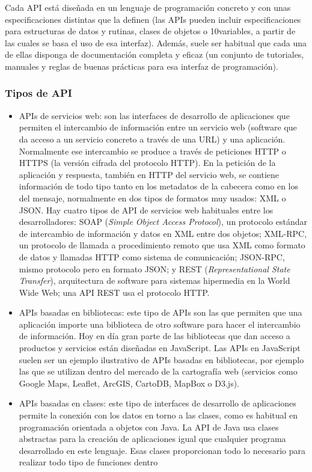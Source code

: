 Cada API está diseñada en un lenguaje de programación concreto y con unas especificaciones distintas que la definen (las APIs pueden incluir especificaciones para estructuras de datos y rutinas, clases de objetos o
10variables, a partir de las cuales se basa el uso de esa interfaz). Además, suele ser habitual que cada una de ellas disponga de documentación completa y eficaz (un conjunto de tutoriales, manuales y reglas de buenas prácticas para esa interfaz de programación).

\subsubsection*{Tipos de API}

\begin{itemize}
  \item APIs de servicios web: son las interfaces de desarrollo de aplicaciones que permiten el intercambio de información entre un servicio web (software que da acceso a un servicio concreto a través de una URL) y una aplicación. Normalmente ese intercambio se produce a través de peticiones HTTP o HTTPS (la versión cifrada del protocolo HTTP). En la petición de la aplicación y respuesta, también en HTTP del servicio web, se contiene información de todo tipo tanto en los metadatos de la cabecera como en los del mensaje, normalmente en dos tipos de formatos muy usados: XML o JSON. Hay cuatro tipos de API de servicios web habituales entre los desarrolladores: SOAP (\textit{Simple Object Access Protocol}), un protocolo estándar de intercambio de información y datos en XML entre dos objetos; XML-RPC, un protocolo de llamada a procedimiento remoto que usa XML como formato de datos y llamadas HTTP como sistema de comunicación; JSON-RPC, mismo protocolo pero en formato JSON; y REST (\textit{Representational State Transfer}), arquitectura de software para sistemas hipermedia en la World Wide Web; una API REST usa el protocolo HTTP.
  \item APIs basadas en bibliotecas: este tipo de APIs son las que permiten que una aplicación importe una biblioteca de otro software para hacer el intercambio de información. Hoy en día gran parte de las bibliotecas que dan acceso a productos y servicios están diseñadas en JavaScript. Las APIs en JavaScript suelen ser un ejemplo ilustrativo de APIs basadas en bibliotecas, por ejemplo las que se utilizan dentro del mercado de la cartografía web (servicios como Google Maps, Leaflet, ArcGIS, CartoDB, MapBox o D3.js).
  \item APIs basadas en clases: este tipo de interfaces de desarrollo de aplicaciones permite la conexión con los datos en torno a las clases, como es habitual en programación orientada a objetos con Java. La API de Java usa clases abstractas para la creación de aplicaciones igual que cualquier programa desarrollado en este lenguaje. Esas clases proporcionan todo lo necesario para realizar todo tipo de funciones dentro

\end{itemize}
